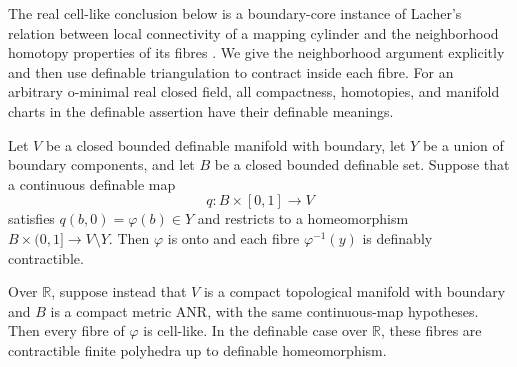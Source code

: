 The real cell-like conclusion below is a boundary-core instance
of Lacher's relation between local connectivity of a mapping
cylinder and the neighborhood homotopy properties of its fibres
\cite[Theorem~2.2, pp.~652--653, and Corollary~2.4, p.~654]
{Lacher1970CellLikeII}.  We give the neighborhood argument explicitly
and then use definable triangulation to contract inside each fibre.
For an arbitrary o-minimal real closed field, all compactness,
homotopies, and manifold charts in the definable assertion have
their definable meanings.

\begin{theorem}\label{thm:boundary-attachment-fibres}
Let $V$ be a closed bounded definable manifold with boundary, let
$Y$ be a union of boundary components, and let $B$ be a closed
bounded definable set.  Suppose that a continuous definable map
\[
 q:B\times[0,1]\longrightarrow V
\]
satisfies $q(b,0)=\varphi(b)\in Y$ and restricts to a homeomorphism
$B\times(0,1]\longrightarrow V\setminus Y$.  Then $\varphi$ is
onto and each fibre $\varphi^{-1}(y)$ is definably contractible.

Over $\mathbb R$, suppose instead that $V$ is a compact topological
manifold with boundary and $B$ is a compact metric ANR, with the
same continuous-map hypotheses.  Then every fibre of $\varphi$ is
cell-like.  In the definable case over $\mathbb R$, these fibres
are contractible finite polyhedra up to definable homeomorphism.
\end{theorem}

